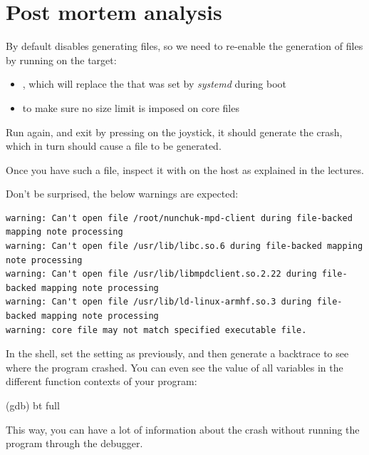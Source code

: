 \section{Post mortem analysis}

By default  disables generating  files, so we
need to re-enable the generation of  files by running on
the target:

\begin{itemize}

\item {}, which will
  replace the  that was set by {\em systemd}
  during boot

\item {} to make sure no size limit is
  imposed on core files

\end{itemize}

Run  again, and exit by pressing  on
the joystick, it should generate the crash, which in turn should cause
a  file to be generated.

Once you have such a file, inspect it with 
on the host as explained in the lectures.

Don't be surprised, the below warnings are expected:

{\small
\begin{verbatim}
warning: Can't open file /root/nunchuk-mpd-client during file-backed mapping note processing
warning: Can't open file /usr/lib/libc.so.6 during file-backed mapping note processing
warning: Can't open file /usr/lib/libmpdclient.so.2.22 during file-backed mapping note processing
warning: Can't open file /usr/lib/ld-linux-armhf.so.3 during file-backed mapping note processing
warning: core file may not match specified executable file.
\end{verbatim}
}

In the  shell, set the  setting as previously, and then
generate a backtrace to see where the program crashed.
You can even see the value of all variables in the different
function contexts of your program:

\begin{bashinput}
(gdb) bt full
\end{bashinput}

This way, you can have a lot of information about the crash
without running the program through the debugger.

